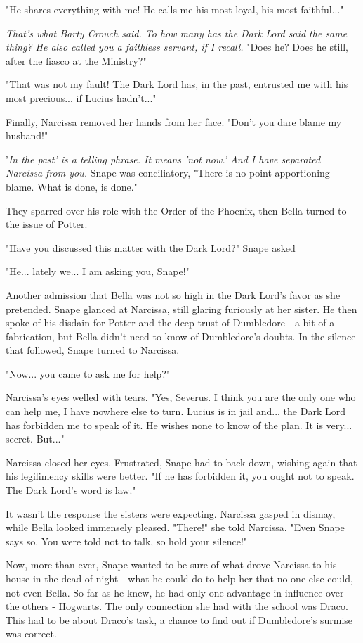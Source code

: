 \documentclass[a4paper,11pt]{article}
\begin{document}
"He shares everything with me! He calls me his most loyal, his most faithful..."

\emph{That's what Barty Crouch said. To how many has the Dark Lord said the same thing? He also called you a faithless servant, if I recall.} "Does he? Does he still, after the fiasco at the Ministry?"

"That was not my fault! The Dark Lord has, in the past, entrusted me with his most precious... if Lucius hadn't..."

Finally, Narcissa removed her hands from her face. "Don't you dare blame my husband!"

'\emph{In the past' is a telling phrase. It means 'not now.' And I have separated Narcissa from you.} Snape was conciliatory, "There is no point apportioning blame. What is done, is done."

They sparred over his role with the Order of the Phoenix, then Bella turned to the issue of Potter.

"Have you discussed this matter with the Dark Lord?" Snape asked

"He... lately we... I am asking you, Snape!"

Another admission that Bella was not so high in the Dark Lord's favor as she pretended. Snape glanced at Narcissa, still glaring furiously at her sister. He then spoke of his disdain for Potter and the deep trust of Dumbledore - a bit of a fabrication, but Bella didn't need to know of Dumbledore's doubts. In the silence that followed, Snape turned to Narcissa.

"Now... you came to ask me for help?"

Narcissa's eyes welled with tears. "Yes, Severus. I think you are the only one who can help me, I have nowhere else to turn. Lucius is in jail and... the Dark Lord has forbidden me to speak of it. He wishes none to know of the plan. It is very... secret. But..."

Narcissa closed her eyes. Frustrated, Snape had to back down, wishing again that his legilimency skills were better. "If he has forbidden it, you ought not to speak. The Dark Lord's word is law."

It wasn't the response the sisters were expecting. Narcissa gasped in dismay, while Bella looked immensely pleased. "There!" she told Narcissa. "Even Snape says so. You were told not to talk, so hold your silence!"

Now, more than ever, Snape wanted to be sure of what drove Narcissa to his house in the dead of night - what he could do to help her that no one else could, not even Bella. So far as he knew, he had only one advantage in influence over the others - Hogwarts. The only connection she had with the school was Draco. This had to be about Draco's task, a chance to find out if Dumbledore's surmise was correct.
\end{document}
